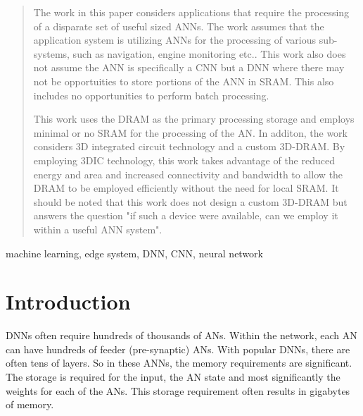 \documentclass[journal]{IEEEtran}
\begin{document}
\begin{abstract}
The work in this paper considers applications that require the processing of a disparate set of useful sized ANNs. The work assumes that the application system is utilizing ANNs
for the processing of various sub-systems, such as navigation, engine monitoring etc.. This work also does not assume the ANN is specifically a CNN but a DNN where there may
not be opportuities to store portions of the ANN in SRAM. This also includes no opportunities to perform batch processing.

This work uses the DRAM as the primary processing storage and employs minimal or no SRAM for the processing of the AN.
In additon, the work considers 3D integrated circuit technology and a custom 3D-DRAM. By employing 3DIC technology, this work takes advantage of the reduced energy and area and increased
connectivity and bandwidth to allow the DRAM to be employed efficiently without the need for local SRAM.
It should be noted that this work does not design a custom 3D-DRAM but answers the question "if such a device were available, can we employ it within a useful ANN system".


\end{abstract}

\begin{IEEEkeywords}
machine learning, edge system, DNN, CNN, neural network
\end{IEEEkeywords}






%
\IEEEpeerreviewmaketitle



\section{Introduction}
% 
% 
% 
% 
 DNNs often require hundreds of thousands of ANs.
Within the network, each AN can have hundreds of feeder (pre-synaptic) ANs.
With popular DNNs, there are often tens of layers. 
So in these ANNs, the memory requirements are significant. The storage is required for the input, the AN state and most significantly the weights for each of the ANs. This storage requirement often results in gigabytes of memory.
\end{document}
